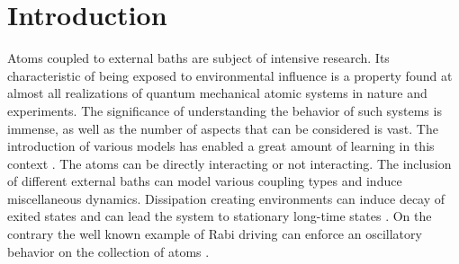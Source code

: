 \chapter{Introduction}
Atoms coupled to external baths are subject of intensive research. Its characteristic of being exposed to environmental influence is a property found at almost all realizations of quantum mechanical atomic systems in nature and experiments. The significance of understanding the behavior of such systems is immense, as well as the number of aspects that can be considered is vast. The introduction of various models has enabled a great amount of learning in this context \cite{diehl_quantum_2008,diehl_dynamical_2010,cabot_metastable_2022,mattes_entangled_2023,krishna_measurement-induced_2023,jin_photon_2013,marcuzzi_absorbing_2016}. The atoms can be directly interacting or not interacting. The inclusion of different external baths can model various coupling types and induce miscellaneous dynamics. Dissipation creating environments can induce decay of exited states and can lead the system to stationary long-time states \cite{camalet_non-equilibrium_2011,huangfu_steady_2018}. On the contrary the well known example of Rabi driving \cite{rabi_space_1937} can enforce an oscillatory behavior on the collection of atoms \cite{dudin_observation_2012}.

